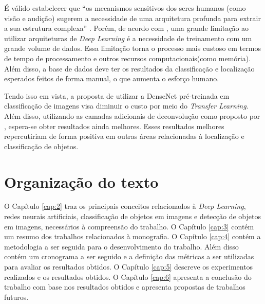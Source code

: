 É válido estabelecer que ``os mecanismos sensitivos dos seres humanos (como visão e audição) sugerem a necessidade de uma arquitetura profunda para extrair a sua estrutura complexa'' \cite{deng-2014}. Porém, de acordo com , uma grande limitação ao utilizar arquiteturas de \emph{Deep Learning} é a necessidade de treinamento com um grande volume de dados. Essa limitação torna o processo mais custoso em termos de tempo de processamento e outros recursos computacionais(como memória). Além disso, a base de dados deve ter os resultados da classificação e localização esperados feitos de forma manual, o que aumenta o esforço humano.

Tendo isso em vista, a proposta de utilizar a \ac{DenseNet} \cite{liu-2017} pré-treinada em classificação de imagens visa diminuir o custo por meio do \textit{Transfer Learning}. Além disso, utilizando as camadas adicionais de deconvolução como proposto por , espera-se obter resultados ainda melhores. Esses resultados melhores repercutiriam de forma positiva em outras áreas relacionadas à localização e classificação de objetos. 

\section{Organização do texto}
\label{secao:1:4}

O Capítulo \ref{cap:2} traz os principais conceitos relacionados à \textit{Deep Learning}, redes neurais artificiais, classificação de objetos em imagens e detecção de objetos em imagens, necessários à compreensão do trabalho. O Capítulo \ref{cap:3} contém um resumo dos trabalhos relacionados à monografia. O Capítulo \ref{cap:4} contém a metodologia a ser seguida para o desenvolvimento do trabalho. Além disso contém um cronograma a ser seguido e a definição das métricas a ser utilizadas para avaliar os resultados obtidos. O Capítulo \ref{cap:5} descreve os experimentos realizados e os resultados obtidos. O Capítulo \ref{cap:6} apresenta a conclusão do trabalho com base nos resultados obtidos e apresenta propostas de trabalhos futuros.